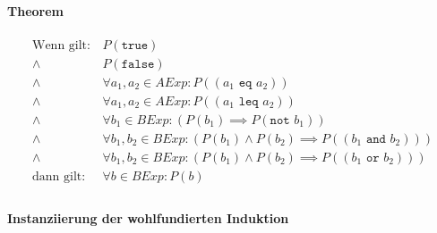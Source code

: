 																\paragraph{Theorem}
																	\begin{align*}
																		\text{Wenn gilt:} & \,P(\texttt{true})                                                                                            \\
																		\land             & \,P(\texttt{false})                                                                                           \\
																		\land             & \,\forall a _ 1, a _ 2 \in \textit{AExp} : P((a _ 1 \texttt{ eq } a _ 2))                                     \\
																		\land             & \,\forall a _ 1, a _ 2 \in \textit{AExp} : P((a _ 1 \texttt{ leq } a _ 2))                                    \\
																		\land             & \,\forall b _ 1 \in \textit{BExp} : (P(b _ 1) \implies P(\texttt{not } b _ 1))                                \\
																		\land             & \,\forall b _ 1, b _ 2 \in \textit{BExp} : (P(b _ 1) \land P(b _ 2) \implies P((b _ 1 \texttt{ and } b _ 2))) \\
																		\land             & \,\forall b _ 1, b _ 2 \in \textit{BExp} : (P(b _ 1) \land P(b _ 2) \implies P((b _ 1 \texttt{ or } b _ 2)))  \\
																		\text{dann gilt:} & \,\forall b \in \textit{BExp} : P(b)                                                                          \\
																	\end{align*}

																\paragraph{Instanziierung der wohlfundierten Induktion}

